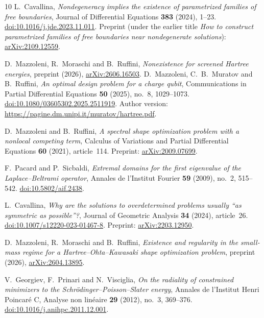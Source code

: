 \documentclass[11pt,a4paper]{article}
\theoremstyle{definition}
\theoremstyle{remark}
\begin{document}
\begin{thebibliography}{10}
L.~Cavallina,
\emph{Nondegeneracy implies the existence of parametrized families of free boundaries},
Journal of Differential Equations \textbf{383} (2024), 1--23.
\href{https://doi.org/10.1016/j.jde.2023.11.011}{doi:10.1016/j.jde.2023.11.011}.
Preprint (under the earlier title \emph{How to construct parametrized families of free boundaries near nondegenerate solutions}): \href{https://arxiv.org/abs/2109.12559}{arXiv:2109.12559}.

D.~Mazzoleni, R.~Moraschi and B.~Ruffini,
\emph{Nonexistence for screened Hartree energies},
preprint (2026), \href{https://arxiv.org/abs/2606.16503}{arXiv:2606.16503}.
D.~Mazzoleni, C.~B.~Muratov and B.~Ruffini,
\emph{An optimal design problem for a charge qubit},
Communications in Partial Differential Equations \textbf{50} (2025), no.~8, 1029--1073.
\href{https://doi.org/10.1080/03605302.2025.2511919}{doi:10.1080/03605302.2025.2511919}.
Author version: \url{https://pagine.dm.unipi.it/muratov/hartree.pdf}.

D.~Mazzoleni and B.~Ruffini,
\emph{A spectral shape optimization problem with a nonlocal competing term},
Calculus of Variations and Partial Differential Equations \textbf{60} (2021), article~114.
Preprint: \href{https://arxiv.org/abs/2009.07699}{arXiv:2009.07699}.

F.~Pacard and P.~Sicbaldi,
\emph{Extremal domains for the first eigenvalue of the Laplace--Beltrami operator},
Annales de l'Institut Fourier \textbf{59} (2009), no.~2, 515--542.
\href{https://doi.org/10.5802/aif.2438}{doi:10.5802/aif.2438}.

L.~Cavallina,
\emph{Why are the solutions to overdetermined problems usually ``as symmetric as possible''?},
Journal of Geometric Analysis \textbf{34} (2024), article~26.
\href{https://doi.org/10.1007/s12220-023-01467-8}{doi:10.1007/s12220-023-01467-8}.
Preprint: \href{https://arxiv.org/abs/2203.12950}{arXiv:2203.12950}.

D.~Mazzoleni, R.~Moraschi and B.~Ruffini,
\emph{Existence and regularity in the small-mass regime for a Hartree--Ohta--Kawasaki shape optimization problem},
preprint (2026), \href{https://arxiv.org/abs/2604.13895}{arXiv:2604.13895}.

V.~Georgiev, F.~Prinari and N.~Visciglia,
\emph{On the radiality of constrained minimizers to the Schr\"odinger--Poisson--Slater energy},
Annales de l'Institut Henri Poincar\'e C, Analyse non lin\'eaire
\textbf{29} (2012), no.~3, 369--376.
\href{https://doi.org/10.1016/j.anihpc.2011.12.001}{doi:10.1016/j.anihpc.2011.12.001}.


\end{thebibliography}
\end{document}
